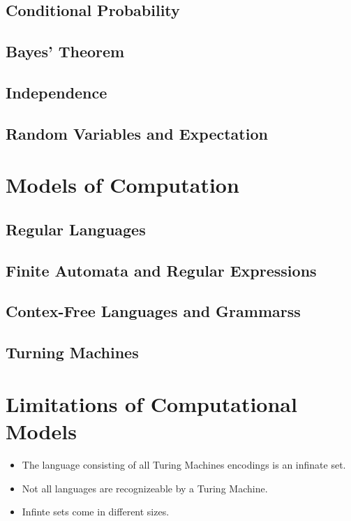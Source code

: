 \documentclass[a4paper]{article}
\begin{document}
\begin{multicols}{2}
	\subsection{Conditional Probability}
	\subsection{Bayes' Theorem}
	\subsection{Independence}
	\subsection{Random Variables and Expectation}

	\section{Models of Computation}
	\subsection{Regular Languages}
	\subsection{Finite Automata and Regular Expressions}
	\subsection{Contex-Free Languages and Grammarss}
	\subsection{Turning Machines}

	\section{Limitations of Computational Models}
	\begin{itemize}
		\item The language consisting of all Turing Machines encodings is an
					infinate set.
		\item Not all languages are recognizeable by a Turing Machine.
		\item Infinte sets come in different sizes.
	\end{itemize}

\end{multicols}
\end{document}
